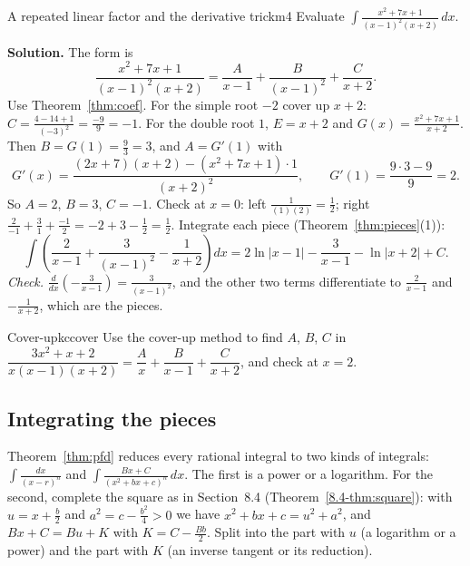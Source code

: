\documentclass[11pt]{article}
\begin{document}
\begin{exmp}{A repeated linear factor and the derivative trick}{m4}
Evaluate $\displaystyle\int\frac{x^2+7x+1}{(x-1)^2(x+2)}\,dx$.

\textbf{Solution.} The form is
\[\frac{x^2+7x+1}{(x-1)^2(x+2)}=\frac A{x-1}+\frac B{(x-1)^2}+\frac C{x+2}.\]
Use Theorem~\ref{thm:coef}. For the simple root $-2$ cover up $x+2$: $C=\frac{4-14+1}{(-3)^2}=\frac{-9}9=-1$. For the double root $1$, $E=x+2$ and $G(x)=\frac{x^2+7x+1}{x+2}$. Then $B=G(1)=\frac93=3$, and $A=G'(1)$ with
\[G'(x)=\frac{(2x+7)(x+2)-(x^2+7x+1)\cdot1}{(x+2)^2},\qquad G'(1)=\frac{9\cdot3-9}{9}=2 .\]
So $A=2$, $B=3$, $C=-1$. Check at $x=0$: left $\frac1{(1)(2)}=\frac12$; right $\frac2{-1}+\frac3{1}+\frac{-1}2=-2+3-\frac12=\frac12$. Integrate each piece (Theorem~\ref{thm:pieces}(1)):
\[\int\left(\frac2{x-1}+\frac3{(x-1)^2}-\frac1{x+2}\right)dx=2\ln\lvert x-1\rvert-\frac3{x-1}-\ln\lvert x+2\rvert+C .\]
\emph{Check.} $\frac d{dx}\left(-\frac3{x-1}\right)=\frac3{(x-1)^2}$, and the other two terms differentiate to $\frac2{x-1}$ and $-\frac1{x+2}$, which are the pieces.
\end{exmp}

\begin{kc}{Cover-up}{kccover}
Use the cover-up method to find $A$, $B$, $C$ in $\dfrac{3x^2+x+2}{x(x-1)(x+2)}=\dfrac Ax+\dfrac B{x-1}+\dfrac C{x+2}$, and check at $x=2$.
\end{kc}

\subsection*{Integrating the pieces}

Theorem~\ref{thm:pfd} reduces every rational integral to two kinds of integrals: $\int\frac{dx}{(x-r)^n}$ and $\int\frac{Bx+C}{(x^2+bx+c)^n}\,dx$. The first is a power or a logarithm. For the second, complete the square as in Section~8.4 (Theorem~\ref{8.4-thm:square}): with $u=x+\frac b2$ and $a^2=c-\frac{b^2}4>0$ we have $x^2+bx+c=u^2+a^2$, and $Bx+C=Bu+K$ with $K=C-\frac{Bb}2$. Split into the part with $u$ (a logarithm or a power) and the part with $K$ (an inverse tangent or its reduction).
\end{document}
